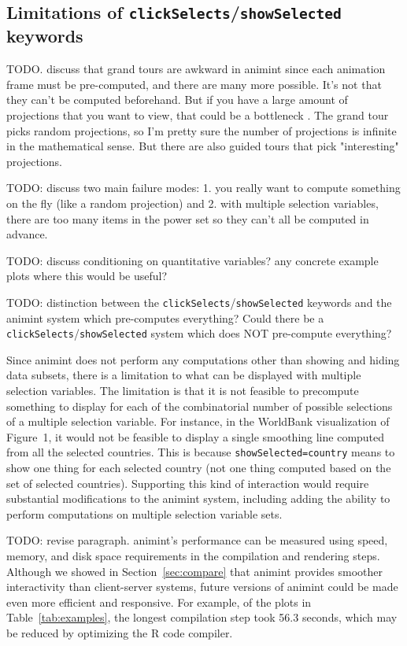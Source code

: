 \documentclass[journal]{vgtc}\usepackage[]{graphicx}\usepackage[]{color}
\begin{document}
\subsection{Limitations of \texttt{clickSelects}/\texttt{showSelected} keywords}

TODO. discuss that grand tours are awkward in animint since each
animation frame must be pre-computed, and there are many more possible.
It's not that they can't be computed beforehand. But if you have a
large amount of projections that you want to view, that could be a
bottleneck \citep{tourr}. The grand tour picks random projections, so
I'm pretty sure the number of projections is infinite in the
mathematical sense. But there are also guided tours that pick
"interesting" projections.

TODO: discuss two main failure modes: 1. you really want to compute
something on the fly (like a random projection) and 2. with multiple
selection variables, there are too many items in the power set so they
can't all be computed in advance.

TODO: discuss conditioning on quantitative variables? any concrete
example plots where this would be useful?

TODO: distinction between the \texttt{clickSelects}/\texttt{showSelected} keywords and
the animint system which pre-computes everything? Could there be a
\texttt{clickSelects}/\texttt{showSelected} system which does NOT pre-compute
everything?

Since animint does not perform any computations other than showing and
hiding data subsets, there is a limitation to what can be
displayed with multiple selection variables.
The limitation is that it is not feasible to precompute
something to display for each of the combinatorial number of
possible selections
of a multiple selection variable.
For instance, in the
WorldBank visualization of Figure~1, it would not be feasible to
display a single smoothing line computed from all the selected
countries. This is because \texttt{showSelected=country} means to show
one thing for each selected country (not one thing computed based on
the set of selected countries). Supporting this kind of interaction
would require substantial modifications to the animint system,
including adding the ability to perform computations on
multiple selection variable sets.

TODO: revise paragraph. animint's performance can be measured using
speed, memory, and disk space requirements in the compilation and
rendering steps. Although we showed in Section~\ref{sec:compare} that
animint provides smoother interactivity than client-server systems,
future versions of animint could be made even more efficient and
responsive. For example, of the plots in Table~\ref{tab:examples}, the
longest compilation step took 56.3 seconds, which may be reduced by
optimizing the R code compiler.
\end{document}
